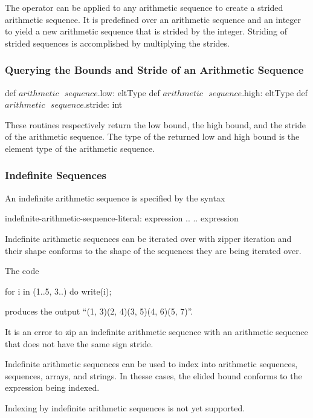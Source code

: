 The  operator can be applied to any arithmetic sequence to
create a strided arithmetic sequence.  It is predefined over an
arithmetic sequence and an integer to yield a new arithmetic sequence
that is strided by the integer.  Striding of strided sequences is
accomplished by multiplying the strides.

\subsubsection{Querying the Bounds and Stride of an Arithmetic Sequence}

\begin{protohead}
def $arithmetic\mbox{ }sequence$.low: eltType
def $arithmetic\mbox{ }sequence$.high: eltType
def $arithmetic\mbox{ }sequence$.stride: int
\end{protohead}
\begin{protobody}
These routines respectively return the low bound, the high bound, and
the stride of the arithmetic sequence.  The type of the returned low
and high bound is the element type of the arithmetic sequence.
\end{protobody}

\subsubsection{Indefinite Sequences}
\label{Indefinite_Sequences}

An indefinite arithmetic sequence is specified by the syntax
\begin{syntax}
indefinite-arithmetic-sequence-literal:
  expression ..
  .. expression
\end{syntax}

Indefinite arithmetic sequences can be iterated over with zipper
iteration and their shape conforms to the shape of the sequences they
are being iterated over.
\begin{example}
The code
\begin{chapel}
for i in (1..5, 3..) do
  write(i);
\end{chapel}
produces the output ``(1, 3)(2, 4)(3, 5)(4, 6)(5, 7)''.
\end{example}

It is an error to zip an indefinite arithmetic sequence with an
arithmetic sequence that does not have the same sign stride.

Indefinite arithmetic sequences can be used to index into arithmetic
sequences, sequences, arrays, and strings.  In thesse cases, the
elided bound conforms to the expression being indexed.
\begin{status}
Indexing by indefinite arithmetic sequences is not yet supported.
\end{status}

